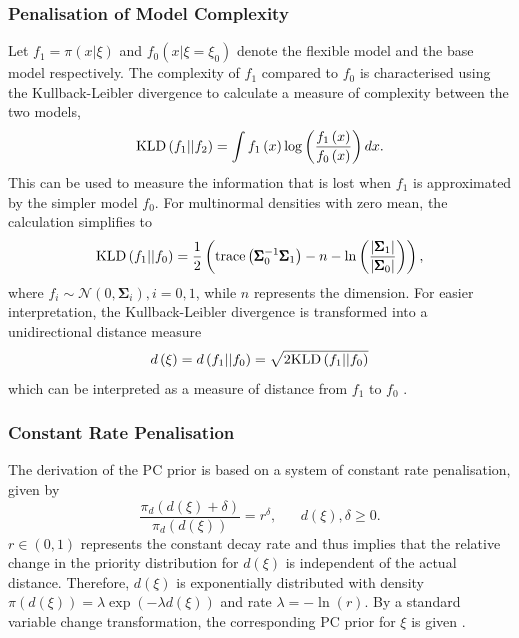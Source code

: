 \subsubsection*{Penalisation of Model Complexity} 
Let $f_1=\pi\left(x|\xi\right)$ and $f_0\left(x|\xi=\xi_0\right)$ denote the flexible model and the base model respectively. The complexity of $f_1$ compared to $f_0$ is characterised using the Kullback-Leibler divergence \autocite[][]{kullback1951information} to calculate a measure of complexity between the two models,
\begin{equation}
    \hbox{KLD}\left(f_1||f_2\right) = \int f_1\left(x\right)\log\left(\frac{f_1\left(x\right)}{f_0\left(x\right)}\right)dx.
\end{equation}
This can be used to measure the information that is lost when $f_1$ is approximated by the simpler model $f_0$. For multinormal densities with zero mean, the calculation simplifies to
\begin{equation}
    \hbox{KLD}\left(f_1||f_0\right) = \frac{1}{2}\left(\hbox{trace}\left(\pmb{\Sigma}_0^{-1}\pmb{\Sigma}_1\right)-n-\ln\left(\frac{\left|\pmb{\Sigma}_1\right|}{\left|\pmb{\Sigma}_0\right|}\right)\right),
\end{equation}
where $f_i\sim\mathcal{N}\left(0,\pmb{\Sigma}_i\right), i=0,1$, while $n$ represents the dimension. For easier interpretation, the Kullback-Leibler divergence is transformed into a unidirectional distance measure
\begin{equation}
    d\left(\xi\right) = d\left(f_1||f_0\right)=\sqrt{2\hbox{KLD}\left(f_1||f_0\right)}
\end{equation}
which can be interpreted as a measure of distance from $f_1$ to $f_0$ \autocite[][]{simpson2017penalising}.
\subsubsection*{Constant Rate Penalisation}
The derivation of the PC prior is based on a system of constant rate penalisation, given by
\begin{equation}
    \frac{\pi_d\left(d\left(\xi\right)+\delta\right)}{\pi_d\left(d\left(\xi\right)\right)}=r^{\delta}, \hspace{20pt} d\left(\xi\right),\delta\geq0.
\end{equation}
$r\in\left(0,1\right)$ represents the constant decay rate and thus implies that the relative change in the priority distribution for $d\left(\xi\right)$ is independent of the actual distance. Therefore, $d\left(\xi\right)$ is exponentially distributed with density $\pi\left(d\left(\xi\right)\right)=\lambda\exp\left(-\lambda d\left(\xi\right)\right)$ and rate $\lambda = -\ln\left(r\right)$. By a standard variable change transformation, the corresponding PC prior for $\xi$ is given \autocite[][]{simpson2017penalising}.
